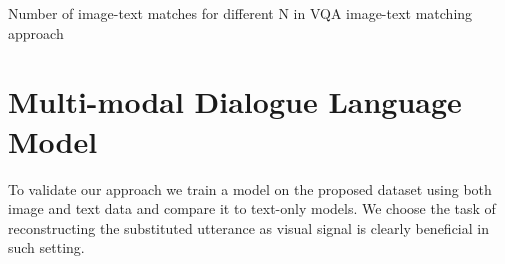 \documentclass[11pt]{article}
\begin{document}
\begin{table}[pt]
    \parbox{.45\linewidth}{
        \centering
        \tabcolsep=0.11cm
        \caption{Number of image-text matches for different N in VQA image-text matching approach}
        \label{TableVQA} 
        
    }
    \hfill
    \parbox{.5\linewidth}{
        \centering
        \tabcolsep=0.11cm
        \caption{Basic Statistics of Dataset}
        \label{TableBasicStatistics} 
        }
\end{table}




\section{Multi-modal Dialogue Language Model}

To validate our approach we train a model on the proposed dataset using both image and text data and compare it to text-only models. We choose the task of reconstructing the substituted utterance as visual signal is clearly beneficial in such setting.
\end{document}
